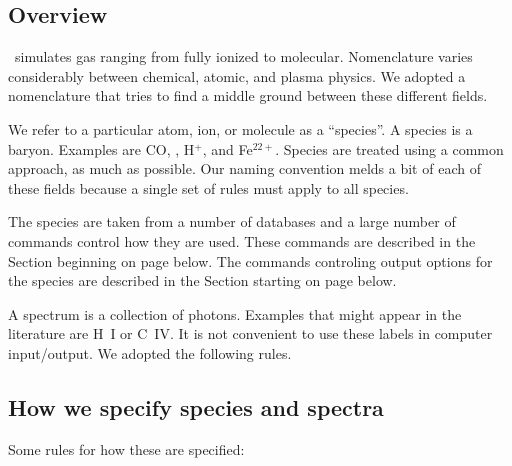 \subsection{Overview}
\Cloudy\ simulates gas ranging from fully ionized to molecular.
Nomenclature varies considerably between chemical, atomic, and plasma physics.
We adopted a nomenclature that tries to find a middle ground between
these different fields.

We refer to a particular atom, ion, or molecule as a ``species''.
A species is a baryon.  Examples are CO, \htwo, H$^+$, and Fe$^{22+}$.
Species are treated using a common approach, as much as possible.
Our naming convention melds a bit of each of these fields
because a single set of rules must apply to all species.

The species are taken from a number of databases and a large
number of commands control how they are used.
These commands are described in the Section beginning on page 
\pageref{sec:ControllingAtomicModels} below.
The commands controling output options for the species are
described in the Section starting on page
\pageref{sec:SaveSpecies} below.

A spectrum is a collection of photons.  Examples that might appear in the literature
are H~I or C~IV.  
It is not convenient to use these labels in computer input/output.
We adopted the following rules.

\subsection{How we specify species and spectra}

Some rules for how these are specified:

